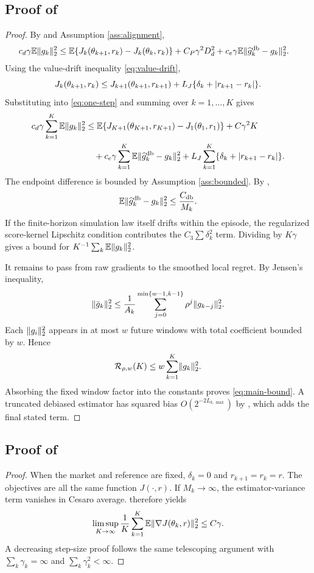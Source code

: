 \documentclass[11pt]{article}
\newcommand{\E}{\mathbb E}
\newcommand{\1}{\mathbf 1}
\DeclarePairedDelimiter{\abs}{\lvert}{\rvert}
\DeclarePairedDelimiter{\norm}{\lVert}{\rVert}
\newcommand{\Reg}{\mathcal R}
\newcommand{\db}{\mathrm{db}}
\begin{document}
\subsection{Proof of }
\begin{proof}
By  and Assumption \ref{ass:alignment},
\begin{align}
 c_d\gamma\E\norm{g_k}_2^2
 &\le \E\{J_k(\theta_{k+1},r_k)-J_k(\theta_k,r_k)\}
 +C_P\gamma^2D_d^2
 +c_e\gamma\E\norm{\widehat g_k^{\db}-g_k}_2^2.\label{eq:one-step}
\end{align}
Using the value-drift inequality \eqref{eq:value-drift},
\[
 J_k(\theta_{k+1},r_k)
 \le J_{k+1}(\theta_{k+1},r_{k+1})
 +L_J\{\delta_k+\abs{r_{k+1}-r_k}\}.
\]
Substituting into \eqref{eq:one-step} and summing over $k=1,\ldots,K$ gives
\begin{align*}
 c_d\gamma\sum_{k=1}^{K}\E\norm{g_k}_2^2
 &\le \E\{J_{K+1}(\theta_{K+1},r_{K+1})-J_1(\theta_1,r_1)\}
 +C\gamma^2K \\
 &\quad +c_e\gamma\sum_{k=1}^{K}\E\norm{\widehat g_k^{\db}-g_k}_2^2
 +L_J\sum_{k=1}^{K}\{\delta_k+\abs{r_{k+1}-r_k}\}.
\end{align*}
The endpoint difference is bounded by Assumption \ref{ass:bounded}.  By ,
\[
 \E\norm{\widehat g_k^{\db}-g_k}_2^2\le {C_{\db}\over M_k}.
\]
If the finite-horizon simulation law itself drifts within the episode, the regularized score-kernel Lipschitz condition contributes the $C_3\sum\delta_k^2$ term.  Dividing by $K\gamma$ gives a bound for $K^{-1}\sum_k\E\norm{g_k}_2^2$.

It remains to pass from raw gradients to the smoothed local regret.  By Jensen's inequality,
\[
 \norm{\bar g_k}_2^2
 \le {1\over A_k}\sum_{j=0}^{\min\{w-1,k-1\}}\rho^j\norm{g_{k-j}}_2^2.
\]
Each $\norm{g_i}_2^2$ appears in at most $w$ future windows with total coefficient bounded by $w$.  Hence
\[
 \Reg_{\rho,w}(K)\le w\sum_{k=1}^{K}\norm{g_k}_2^2.
\]
Absorbing the fixed window factor into the constants proves \eqref{eq:main-bound}.  A truncated debiased estimator has squared bias $O(2^{-2L_{k,\max}})$ by , which adds the final stated term.
\end{proof}

\subsection{Proof of }
\begin{proof}
When the market and reference are fixed, $\delta_k=0$ and $r_{k+1}=r_k=r$.  The objectives are all the same function $J(\cdot,r)$.  If $M_k\to\infty$, the estimator-variance term vanishes in Cesaro average.   therefore yields
\[
 \limsup_{K\to\infty}{1\over K}\sum_{k=1}^{K}\E\norm{\nabla J(\theta_k,r)}_2^2\le C\gamma.
\]
A decreasing step-size proof follows the same telescoping argument with $\sum_k\gamma_k=\infty$ and $\sum_k\gamma_k^2<\infty$.
\end{proof}
\end{document}
